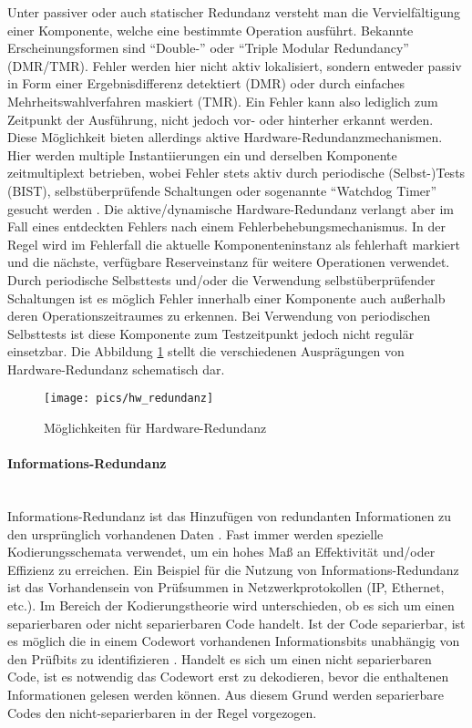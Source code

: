 Unter passiver oder auch statischer Redundanz versteht man die
Vervielfältigung einer Komponente, welche eine bestimmte Operation
ausführt. Bekannte Erscheinungsformen sind ``Double-'' oder ``Triple
Modular Redundancy'' (DMR/TMR). Fehler werden hier nicht aktiv
lokalisiert, sondern entweder passiv in Form einer Ergebnisdifferenz
detektiert (DMR) oder durch einfaches Mehrheitswahlverfahren maskiert
(TMR). Ein Fehler kann also lediglich zum Zeitpunkt der Ausführung,
nicht jedoch vor- oder hinterher erkannt werden. Diese Möglichkeit
bieten allerdings aktive Hardware-Redundanzmechanismen. Hier werden
multiple Instantiierungen ein und derselben Komponente zeitmultiplext
betrieben, wobei Fehler stets aktiv durch periodische (Selbst-)Tests
(BIST), selbstüberprüfende Schaltungen oder sogenannte ``Watchdog
Timer'' gesucht werden \cite[S. 168ff.]{lala2001}. Die
aktive/dynamische Hardware-Redundanz verlangt aber im Fall eines
entdeckten Fehlers nach einem Fehlerbehebungsmechanismus. In der Regel
wird im Fehlerfall die aktuelle Komponenteninstanz als fehlerhaft
markiert und die nächste, verfügbare Reserveinstanz für weitere
Operationen verwendet. Durch periodische Selbsttests und/oder die
Verwendung selbstüberprüfender Schaltungen ist es möglich Fehler
innerhalb einer Komponente auch außerhalb deren Operationszeitraumes
zu erkennen. Bei Verwendung von periodischen Selbsttests ist diese
Komponente zum Testzeitpunkt jedoch nicht regulär einsetzbar. Die
Abbildung \ref{fig:grundlagen_gegenmassnahmen_hw_redundanz} stellt die
verschiedenen Ausprägungen von Hardware-Redundanz schematisch dar. 

\begin{figure}[htbp]
	\centering
	\texttt{[image: pics/hw\_redundanz]}
	\caption{Möglichkeiten für Hardware-Redundanz}
	\label{fig:grundlagen_gegenmassnahmen_hw_redundanz}
\end{figure}

\paragraph{Informations-Redundanz}\hspace{0cm}\\
\label{sec:grundlagen_fehler_schutz_informationsredundanz}
Informations-Redundanz ist das Hinzufügen von redundanten
Informationen zu den ursprünglich vorhandenen Daten
\cite{johnson1989}. Fast immer werden spezielle Kodierungsschemata
verwendet, um ein hohes Maß an Effektivität und/oder Effizienz zu
erreichen. Ein Beispiel für die Nutzung von Informations-Redundanz ist
das Vorhandensein von Prüfsummen in Netzwerkprotokollen (IP, Ethernet,
etc.). Im Bereich der Kodierungstheorie wird unterschieden, ob es sich
um einen separierbaren oder nicht separierbaren Code handelt. Ist der
Code separierbar, ist es möglich die in einem Codewort vorhandenen
Informationsbits unabhängig von den Prüfbits zu identifizieren
\cite[S. 16]{lala2001}. Handelt es sich um einen nicht separierbaren
Code, ist es notwendig das Codewort erst zu dekodieren, bevor die
enthaltenen Informationen gelesen werden können. Aus diesem Grund
werden separierbare Codes den nicht-separierbaren in der Regel
vorgezogen.

